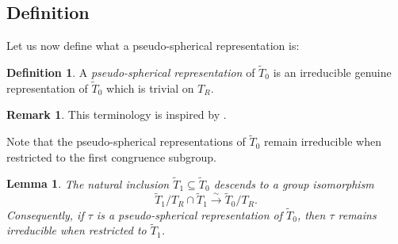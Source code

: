 \documentclass[10pt, letterpaper]{amsart}
\theoremstyle{plain}
\newtheorem{Lem}[equation]{Lemma}
\theoremstyle{definition}
\newtheorem*{Rmk}{Remark}
\newtheorem{Def}[equation]{Definition}
\numberwithin{equation}{section}
\newcommand{\hta}{\tilde{h}_{\alpha}}
\newcommand{\Tt}{\widetilde{T}}
\newcommand{\Ocal}{\mathcal{O}}
\newcommand{\ie}{{\it i.e.}\ }
\begin{document}

\subsection{Definition}


Let us now define what a pseudo-spherical representation is:
\begin{Def}\label{Def:PSTRep}
	A {\it pseudo-spherical representation} of $\Tt_{0}$ is an irreducible genuine representation of $\Tt_{0}$ which is trivial on $T_{R}$. 
\end{Def}

\begin{Rmk}This terminology is inspired by \cite{ABPTV,LS10a,LS10b}.\end{Rmk}

Note that the pseudo-spherical representations of $\Tt_{0}$ remain irreducible when restricted to the first congruence subgroup.

\begin{Lem}\label{RedtoU1}
	The natural inclusion $\Tt_{1}\subseteq \Tt_{0}$ descends to a group isomorphism 
	\begin{equation*}
		\Tt_{1}/T_{R}\cap \Tt_{1}\xrightarrow{\;\sim\;}\Tt_{0}/T_{R}.
	\end{equation*}
	Consequently, if $\tau$ is a pseudo-spherical representation of $\Tt_{0}$, then $\tau$ remains irreducible when restricted to $\Tt_{1}$.
\end{Lem}
\end{document}
